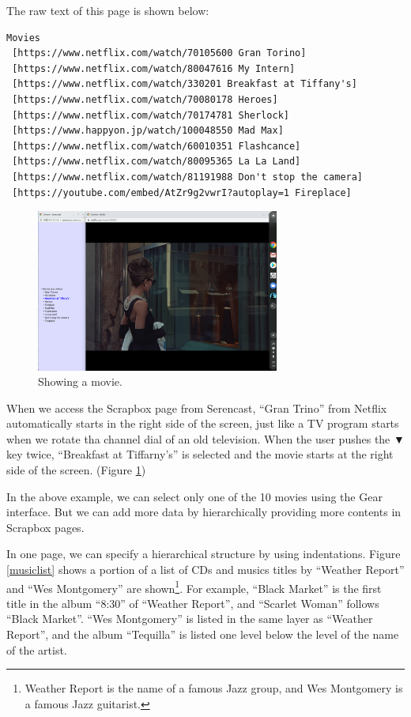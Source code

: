 \documentclass{article}
\def\down{▼}
\def\SC{\textsf{\small Serencast}}
\def\SB{\textsf{\small Scrapbox}}
\begin{document}
The raw text of this page is shown below:

{\scriptsize
\begin{verbatim}
Movies
 [https://www.netflix.com/watch/70105600 Gran Torino]
 [https://www.netflix.com/watch/80047616 My Intern]
 [https://www.netflix.com/watch/330201 Breakfast at Tiffany's]
 [https://www.netflix.com/watch/70080178 Heroes]
 [https://www.netflix.com/watch/70174781 Sherlock]
 [https://www.happyon.jp/watch/100048550 Mad Max]
 [https://www.netflix.com/watch/60010351 Flashcance]
 [https://www.netflix.com/watch/80095365 La La Land]
 [https://www.netflix.com/watch/81191988 Don't stop the camera]
 [https://youtube.com/embed/AtZr9g2vwrI?autoplay=1 Fireplace]
\end{verbatim}}

\begin{figure}[H]
\centerline{\includegraphics[width=80mm,bb=0 0 2400 1600]{figures/e8ae562a5a68a1955ac70b4faed9a146.png}}
\caption{Showing a movie.}
\label{tiffany}
\end{figure}

When we access the {\SB} page from {\SC},
``Gran Trino'' from Netflix automatically starts in the right side of the screen,
just like a TV program starts when we rotate tha channel dial of an old television.
When the user pushes the {\down} key twice,
``Breakfast at Tiffarny's'' is selected and
the movie starts at the right side of the screen. (Figure \ref{tiffany})

In the above example, we can select only one of the 10 movies using the Gear interface.
But we can add more data by hierarchically providing more contents in {\SB} pages.

In one page, we can specify a hierarchical structure by using indentations.
Figure \ref{musiclist} shows a portion of a list of CDs and
musics titles by ``Weather Report'' and ``Wes Montgomery'' are shown\footnote{
  Weather Report is the name of a famous Jazz group, and Wes Montgomery is a famous Jazz guitarist.
}.
For example, 
``Black Market'' is the first title in the album ``8:30'' of ``Weather Report'', and
``Scarlet Woman'' follows ``Black Market''.
``Wes Montgomery'' is listed in the same layer as ``Weather Report'', and
the album ``Tequilla'' is listed one level below the level of the name of the artist.
\end{document}
